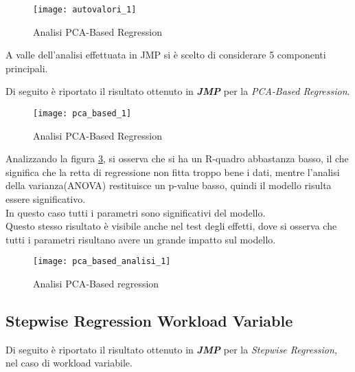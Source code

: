 \begin{figure}[!htbp]
  \centering
  \texttt{[image: autovalori\_1]}
  \caption{Analisi PCA-Based Regression}
  \label{autovalori_1}
\end{figure}

A valle dell'analisi effettuata in JMP si è scelto di considerare 5 componenti
principali.\\

\clearpage

Di seguito è riportato il risultato ottenuto in \textbf{\textit{JMP}} per
la \textit{PCA-Based Regression}.\\

\begin{figure}[!htbp]
  \centering
  \texttt{[image: pca\_based\_1]}
  \caption{Analisi PCA-Based Regression}
  \label{pca_based_1}
\end{figure}

\clearpage

Analizzando la figura \ref{pca_based_analisi_1}, si osserva che si ha un R-quadro
abbastanza basso, il che significa che la retta di regressione non fitta troppo
bene i dati, mentre l'analisi della varianza(ANOVA) restituisce un p-value basso,
quindi il modello risulta essere significativo.\\
In questo caso tutti i parametri sono significativi del modello.\\
Questo stesso risultato è visibile anche nel test degli effetti, dove si osserva
che tutti i parametri risultano avere un grande impatto sul modello.\\

\begin{figure}[!htbp]
  \centering
  \texttt{[image: pca\_based\_analisi\_1]}
  \caption{Analisi PCA-Based regression}
  \label{pca_based_analisi_1}
\end{figure}

\clearpage

\subsection{Stepwise Regression Workload Variable}

Di seguito è riportato il risultato ottenuto in \textbf{\textit{JMP}} per
la \textit{Stepwise Regression}, nel caso di workload variabile.\\

